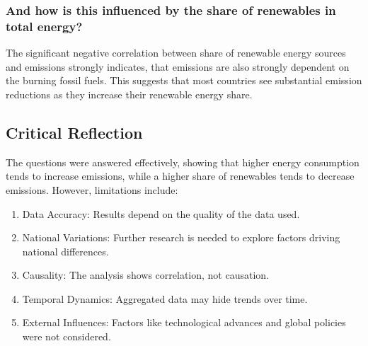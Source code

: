 \documentclass{article}
\begin{document}
\subsubsection*{And how is this influenced by the share of renewables in total energy?}
The significant negative correlation between share of renewable energy sources and emissions strongly indicates, that emissions are also strongly
dependent on the burning fossil fuels.
This suggests that most countries see substantial emission reductions as they increase their renewable energy share.

\subsection*{Critical Reflection}
The questions were answered effectively, showing that higher energy consumption tends to increase emissions,
while a higher share of renewables tends to decrease emissions. However, limitations include:
\begin{enumerate}
    \item Data Accuracy: Results depend on the quality of the data used.
    \item National Variations: Further research is needed to explore factors driving national differences.
    \item Causality: The analysis shows correlation, not causation.
    \item Temporal Dynamics: Aggregated data may hide trends over time.
    \item External Influences: Factors like technological advances and global policies were not considered.
\end{enumerate}
\end{document}

